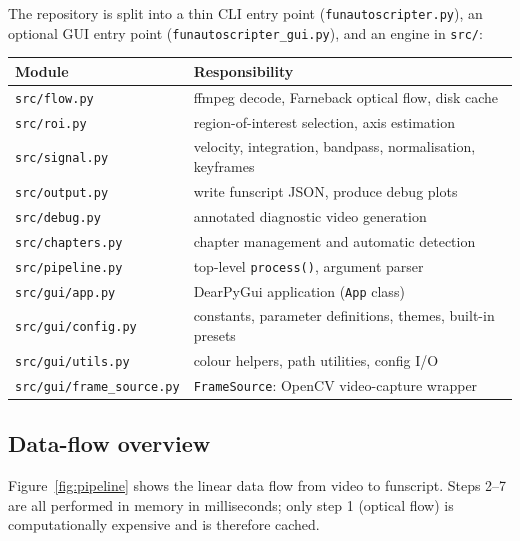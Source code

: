 \documentclass[12pt,a4paper]{article}
\begin{document}
The repository is split into a thin CLI entry point
(\texttt{funautoscripter.py}), an optional GUI entry point
(\texttt{funautoscripter\_gui.py}), and an engine in \texttt{src/}:

\medskip
\begin{center}
\begin{tabular}{@{}ll@{}}
\toprule
Module & Responsibility \\
\midrule
\texttt{src/flow.py}      & ffmpeg decode, Farneback optical flow, disk cache \\
\texttt{src/roi.py}       & region-of-interest selection, axis estimation \\
\texttt{src/signal.py}    & velocity, integration, bandpass, normalisation, keyframes \\
\texttt{src/output.py}    & write funscript JSON, produce debug plots \\
\texttt{src/debug.py}     & annotated diagnostic video generation \\
\texttt{src/chapters.py}  & chapter management and automatic detection \\
\texttt{src/pipeline.py}  & top-level \texttt{process()}, argument parser \\
\texttt{src/gui/app.py}   & DearPyGui application (\texttt{App} class) \\
\texttt{src/gui/config.py}& constants, parameter definitions, themes, built-in presets \\
\texttt{src/gui/utils.py} & colour helpers, path utilities, config I/O \\
\texttt{src/gui/frame\_source.py} & \texttt{FrameSource}: OpenCV video-capture wrapper \\
\bottomrule
\end{tabular}
\end{center}

\subsection{Data-flow overview}

Figure~\ref{fig:pipeline} shows the linear data flow from video to funscript.
Steps 2--7 are all performed in memory in milliseconds; only step 1
(optical flow) is computationally expensive and is therefore cached.
\end{document}
